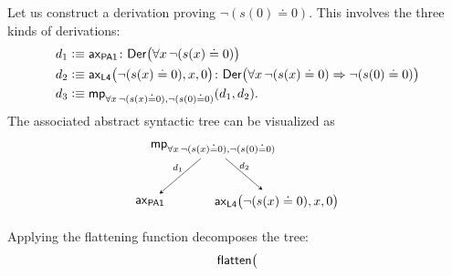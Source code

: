 \begin{xmpls}
\begin{description}[font=\normalfont\scshape]
        \item[Modus Ponens.]
        Let us construct a derivation proving $\neg(s(0)\doteq 0)$. This involves the three kinds of derivations:
        \begin{align*}
            d_1&\defeq
                \fun{ax}_{\fun{PA1}}\colon
                    \fun{Der}\bigl(
                        \forall x\,\neg(s(x)\doteq0)
                    \bigr)\\
            d_2&\defeq
                \fun{ax}_{\fun{L4}}\bigl(
                    \neg(s(x)\doteq 0),x,0
                \bigr)\colon
                    \fun{Der}\bigl(
                        \forall x\,
                            \neg(s(x)\doteq0)
                            \imp
                            \neg(s(0)\doteq0)
                    \bigr)\\
            d_3&\defeq
                \fun{mp}_{\forall x\,\neg(s(x)\doteq0),
                    \neg(s(0)\doteq0)}(d_1,d_2).
        \end{align*}
        The associated abstract syntactic tree can be visualized as
        \[
            \begin{tikzpicture}[
                level distance=1.5cm,
                sibling distance=3.5cm,
                edge from parent/.style={draw,-stealth}
                ]
                \node{
                    $\fun{mp}_{
                    \forall x\,\neg(s(x)\doteq 0),
                    \neg(s(0)\doteq 0)
                    }$
                }
                    child{
                        node{$\fun{ax}_{\fun{PA1}}$}
                        edge from parent node[
                            above left, 
                            xshift=0.2cm
                        ]{$\scriptstyle d_1$}
                    }
                    child{
                        node{$
                            \fun{ax}_{\fun{L4}}
                                \bigl(
                                    \neg(s(x)\doteq 0),
                                    x,
                                    0
                                \bigr)
                        $}
                        edge from parent node[
                            above right,
                            xshift=-0.25cm
                        ]{$\scriptstyle d_2$}
                    };
            \end{tikzpicture}
        \]
        Applying the flattening function decomposes the tree:
        \begin{align*}
            \fun{flatten}\bigl(

\end{align*}
\end{description}
\end{xmpls}

